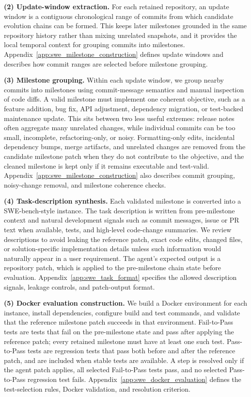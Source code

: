 \documentclass{article}
\begin{document}
\textbf{(2) Update-window extraction.} \noindent
For each retained repository, an update window is a contiguous chronological range of commits from which candidate evolution chains can be formed. This keeps later milestones grounded in the same repository history rather than mixing unrelated snapshots, and it provides the local temporal context for grouping commits into milestones. Appendix~\ref{app:swe_milestone_construction} defines update windows and describes how commit ranges are selected before milestone grouping.

\textbf{(3) Milestone grouping.} \noindent
Within each update window, we group nearby commits into milestones using commit-message semantics and manual inspection of code diffs. A valid milestone must implement one coherent objective, such as a feature addition, bug fix, API adjustment, dependency migration, or test-backed maintenance update. This sits between two less useful extremes: release notes often aggregate many unrelated changes, while individual commits can be too small, incomplete, refactoring-only, or noisy. Formatting-only edits, incidental dependency bumps, merge artifacts, and unrelated changes are removed from the candidate milestone patch when they do not contribute to the objective, and the cleaned milestone is kept only if it remains executable and test-valid. Appendix~\ref{app:swe_milestone_construction} also describes commit grouping, noisy-change removal, and milestone coherence checks.

\textbf{(4) Task-description synthesis.} \noindent
Each validated milestone is converted into a SWE-bench-style instance. The task description is written from pre-milestone context and natural development signals such as commit messages, issue or PR text when available, tests, and high-level code-change summaries. We review descriptions to avoid leaking the reference patch, exact code edits, changed files, or solution-specific implementation details unless such information would naturally appear in a user requirement. The agent's expected output is a repository patch, which is applied to the pre-milestone chain state before evaluation. Appendix~\ref{app:swe_task_format} specifies the allowed description signals, leakage controls, and patch-output format.

\textbf{(5) Docker evaluation construction.} \noindent
We build a Docker environment for each instance, install dependencies, configure build and test commands, and validate that the reference milestone patch succeeds in that environment. Fail-to-Pass tests are tests that fail on the pre-milestone state and pass after applying the reference patch; every retained milestone must have at least one such test. Pass-to-Pass tests are regression tests that pass both before and after the reference patch, and are included when stable tests are available. A step is resolved only if the agent patch applies, all selected Fail-to-Pass tests pass, and no selected Pass-to-Pass regression test fails. Appendix~\ref{app:swe_docker_evaluation} defines the test-selection rules, Docker validation, and resolution criterion.
\end{document}
